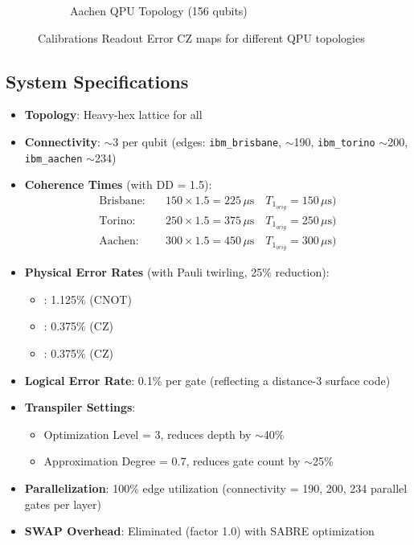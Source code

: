 \documentclass[conference,twoside]{IEEEtran}
\begin{document}
\begin{figure}[!htbp]
\begin{subfigure}{\columnwidth}
        \small{Aachen QPU Topology (156 qubits)}\\
    \end{subfigure}
    \caption{Calibrations Readout Error CZ maps for different QPU topologies}
    \label{fig:calibration_maps}
\end{figure}

\subsection{System Specifications}
\begin{itemize}
    \item \textbf{Topology}: Heavy-hex lattice for all
    \item \textbf{Connectivity}: $\sim$3 per qubit (edges: \texttt{ibm\_brisbane},  $\sim$190, \texttt{ibm\_torino}  $\sim$200, \texttt{ibm\_aachen} $\sim$234)
    \item \textbf{Coherence Times} (with DD = 1.5):
    \begin{align*}
    \text{Brisbane:} \quad & 150 \times 1.5 = 225 \, \mu\text{s} \quad T_1_{orig} = 150 \, \mu\text{s}\text{)} \\ 
    \text{Torino:} \quad & 250 \times 1.5 = 375 \, \mu\text{s} \quad  T_1_{orig} = 250 \, \mu\text{s}\text{)} \\
   \text{Aachen:} \quad & 300 \times 1.5 = 450 \, \mu\text{s} \quad  T_1_{orig} = 300 \, \mu\text{s}\text{)}
    \end{align*}
    \item \textbf{Physical Error Rates} (with Pauli twirling, 25\% reduction):
    \begin{itemize}
        \item {}: 1.125\% (CNOT)
        \item {}: 0.375\% (CZ)
        \item {}: 0.375\% (CZ)
    \end{itemize}
    \item \textbf{Logical Error Rate}: 0.1\% per gate (reflecting a distance-3 surface code)
    \item \textbf{Transpiler Settings}:
    \begin{itemize}
        \item Optimization Level = 3, reduces depth by $\sim$40\%
        \item Approximation Degree = 0.7, reduces gate count by $\sim$25\%
    \end{itemize}
    \item \textbf{Parallelization}: 100\% edge utilization (connectivity = 190, 200, 234 parallel gates per layer)
    \item \textbf{SWAP Overhead}: Eliminated (factor 1.0) with SABRE optimization
\end{itemize}
\end{document}
